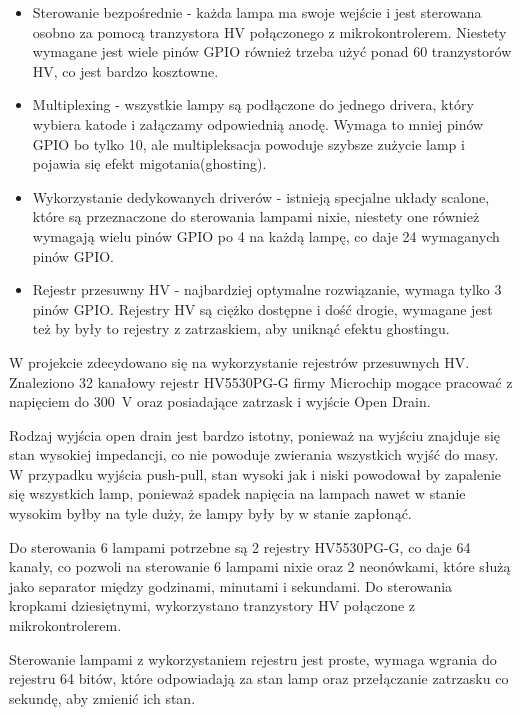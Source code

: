 \documentclass[../main.tex]{subfiles}
\begin{document}
\begin{itemize}
    \item Sterowanie bezpośrednie - każda lampa ma swoje wejście i jest sterowana osobno za pomocą tranzystora HV połączonego z mikrokontrolerem.
    Niestety wymagane jest wiele pinów GPIO również trzeba użyć ponad 60 tranzystorów HV, co jest bardzo kosztowne.
    \item Multiplexing - wszystkie lampy są podłączone do jednego drivera, który wybiera katode i załączamy odpowiednią anodę. 
    Wymaga to mniej pinów GPIO bo tylko 10, ale multipleksacja powoduje szybsze zużycie lamp i pojawia się efekt migotania(ghosting).
    \item Wykorzystanie dedykowanych driverów - istnieją specjalne układy scalone, które są przeznaczone do sterowania lampami nixie, niestety
    one również wymagają wielu pinów GPIO po 4 na każdą lampę, co daje 24 wymaganych pinów GPIO.
    \item Rejestr przesuwny HV - najbardziej optymalne rozwiązanie, wymaga tylko 3 pinów GPIO. Rejestry HV są ciężko dostępne i dość drogie,
    wymagane jest też by były to rejestry z zatrzaskiem, aby uniknąć efektu ghostingu.
\end{itemize}

W projekcie zdecydowano się na wykorzystanie rejestrów przesuwnych HV. Znaleziono 32 kanałowy rejestr 
HV5530PG-G firmy Microchip mogące pracować z napięciem do \SI{300}{\volt} oraz posiadające zatrzask i wyjście Open Drain.

Rodzaj wyjścia open drain jest bardzo istotny, ponieważ na wyjściu znajduje się stan wysokiej impedancji, co nie powoduje zwierania wszystkich wyjść do masy.
W przypadku wyjścia push-pull, stan wysoki jak i niski powodował by zapalenie się wszystkich lamp, ponieważ spadek napięcia na lampach
nawet w stanie wysokim byłby na tyle duży, że lampy były by w stanie zapłonąć.

Do sterowania 6 lampami potrzebne są 2 rejestry HV5530PG-G, co daje 64 kanały, co pozwoli na sterowanie 6 lampami nixie oraz 2 neonówkami, które
służą jako separator między godzinami, minutami i sekundami. Do sterowania kropkami dziesiętnymi, wykorzystano tranzystory HV połączone z mikrokontrolerem.

Sterowanie lampami z wykorzystaniem rejestru jest proste, wymaga wgrania do rejestru 64 bitów, które odpowiadają za stan lamp oraz przełączanie
zatrzasku co sekundę, aby zmienić ich stan.

\newpage
\end{document}
